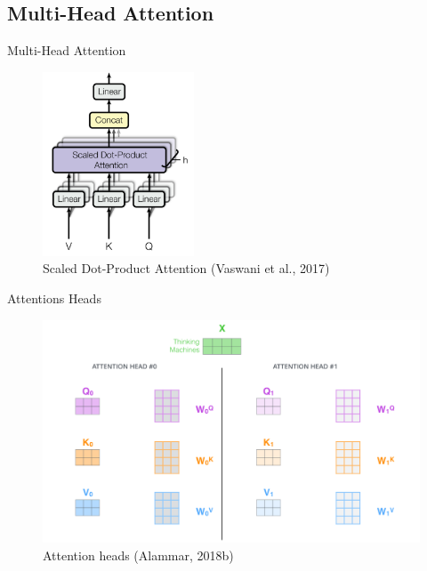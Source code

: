 \documentclass[10pt]{beamer}
\begin{document}
\subsection{Multi-Head Attention}

\begin{frame}{Multi-Head Attention}

\begin{figure}[h]
\centering
\includegraphics[width=0.4\textwidth]{fig/Vaswani_2_multi_head.png}
\caption{Scaled Dot-Product Attention (Vaswani et al., 2017)}
\end{figure}

\end{frame}


\begin{frame}{Attentions Heads}

\begin{figure}[h]
\centering
\includegraphics[width=1\textwidth]{fig/alammar_transformer_attention_heads_qkv.png}
\caption{Attention heads (Alammar, 2018b)}
\end{figure}

\end{frame}
\end{document}
